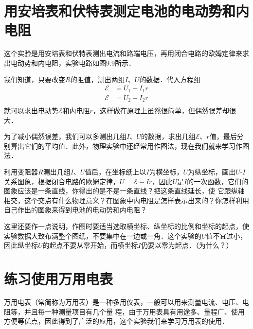 \section{用安培表和伏特表测定电池的电动势和内电阻}

这个实验是用安培表和伏特表测出电流和路端电压，再用闭合电路的欧姆定律来求出电动势和内电阻，实验电路如图9.9所示．

我们知道，只要改变$R$的阻值，测出两组$I$、$U$的数据．代入方程组
\[\begin{split}
    \mathcal{E}&=U_1+I_1r\\
    \mathcal{E}&=U_2+I_2r\\
\end{split}\]
就可以求出电动势$\mathcal{E}$和内电阻$r$，这样做在原理上虽然很简单，但偶然误差却很大．

为了减小偶然误差，我们可以多测出几组$I$、$U$的数据，求出几组$\mathcal{E}$、$r$值，最后分别算出它们的平均值．此外，物理实验中还经常用作图法，现在我们就来学习作图法．

利用变阻器$R$测出几组$I$、$U$值后，在坐标纸上以$I$为横坐标，$U$为纵坐标，画出$U$-$I$关系图象，根据闭合电路的欧姆定律，$U=\mathcal{E}-Ir$，因此$U$是$I$的一次函数，它们的图象应该是一条直线，你得出的是不是一条直线？把这条直线延长，使
它跟纵轴相交，这个交点有什么物理意义？在图象中内电阻是怎样表示出来的？你怎样利用自己作出的图象来得到电池的电动势和内电阻？

这里还要作一点说明，作图时要适当选取横坐标、纵坐标的比例和坐标的起点，使实验数据大致布满整个图纸，不要集中在一边或一角．这个实验的$U$值不宜过小，因此纵坐标$U$的起点不要从零开始，而横坐标$I$仍要以零为起点．（为什么？）

\section{练习使用万用电表}
万用电表（常简称为万用表）是一种多用仪表，一般可以用来测量电流、电压、电阻等，并且每一种测量项目有几个量
程，由于万用表具有用途多、量程广、使用方便等优点，因此得到了广泛的应用，这个实验我们来学习万用表的使用．

